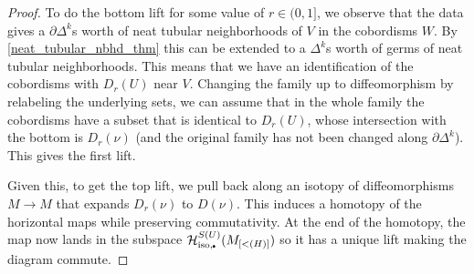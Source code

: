 \documentclass[11pt]{amsart}
\theoremstyle{definition}
\numberwithin{equation}{section}
\numberwithin{figure}{section}
\newcommand{\ti}{\widetilde}
\newcommand{\mc}{\mathcal}
\newcommand{\iso}{\mathrm{iso}}
\newcommand{\sbt}{\,\begin{picture}(-1,1)(0.5,-1)\circle*{1.8}\end{picture}\hspace{.05cm}}
\begin{document}
\begin{proof}
	To do the bottom lift for some value of $r \in (0,1]$, we observe that the data gives a $\partial \Delta^k$s worth of neat tubular neighborhoods of $V$ in the cobordisms $W$. By \autoref{neat_tubular_nbhd_thm} this can be extended to a $\Delta^k$s worth of germs of neat tubular neighborhoods. This means that we have an identification of the cobordisms with $D_r(U)$ near $V$. Changing the family up to diffeomorphism by relabeling the underlying sets, we can assume that in the whole family the cobordisms have a subset that is identical to $D_r(U)$, whose intersection with the bottom is $D_r(\nu)$ (and the original family has not been changed along $\partial \Delta^k$). This gives the first lift.
	
	Given this, to get the top lift, we pull back along an isotopy of diffeomorphisms $M \to M$ that expands $D_r(\nu)$ to $D(\nu)$. This induces a homotopy of the horizontal maps while preserving commutativity. At the end of the homotopy, the map now lands in the subspace $\mc H_{\iso,\sbt}^{S(U)}(M_{[<(H)]})$ so it has a unique lift making the diagram commute.
%	
%

\end{proof}
\end{document}

